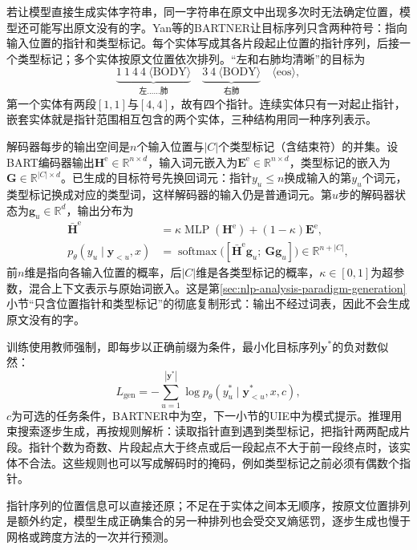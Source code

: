 若让模型直接生成实体字符串，同一字符串在原文中出现多次时无法确定位置，模型还可能写出原文没有的字。Yan等的BARTNER让目标序列只含两种符号：指向输入位置的指针和类型标记。每个实体写成其各片段起止位置的指针序列，后接一个类型标记；多个实体按原文位置依次排列。“左和右肺均清晰”的目标为
\[
  \underbrace{1\ 1\ 4\ 4\ \langle\mathrm{BODY}\rangle}_{\text{左……肺}}\quad
  \underbrace{3\ 4\ \langle\mathrm{BODY}\rangle}_{\text{右肺}}\quad\langle\mathrm{eos}\rangle,
\]
第一个实体有两段$[1,1]$与$[4,4]$，故有四个指针。连续实体只有一对起止指针，嵌套实体就是指针范围相互包含的两个实体，三种结构用同一种序列表示。

解码器每步的输出空间是$n$个输入位置与$|C|$个类型标记（含结束符）的并集。设BART编码器输出$\bm H^{\mathrm e}\in\mathbb R^{n\times d}$，输入词元嵌入为$\bm E^{\mathrm e}\in\mathbb R^{n\times d}$，类型标记的嵌入为$\bm G\in\mathbb R^{|C|\times d}$。已生成的目标符号先换回词元：指针$y_u\leq n$换成输入的第$y_u$个词元，类型标记换成对应的类型词，这样解码器的输入仍是普通词元。第$u$步的解码器状态为$\bm g_u\in\mathbb R^{d}$，输出分布为
\begin{equation}
  \begin{aligned}
    \bar{\bm H}^{\mathrm e}&=\kappa\operatorname{MLP}(\bm H^{\mathrm e})+(1-\kappa)\bm E^{\mathrm e},\\
    p_\theta(y_u\mid\bm y_{<u},x)&=\operatorname{softmax}\bigl([\bar{\bm H}^{\mathrm e}\bm g_u;\ \bm G\bm g_u]\bigr)\in\mathbb R^{n+|C|},
  \end{aligned}
  \label{eq:nlp-extraction-bartner}
\end{equation}
前$n$维是指向各输入位置的概率，后$|C|$维是各类型标记的概率，$\kappa\in[0,1]$为超参数，混合上下文表示与原始词嵌入。这是第\ref{sec:nlp-analysis-paradigm-generation}小节“只含位置指针和类型标记”的彻底复制形式：输出不经过词表，因此不会生成原文没有的字。

训练使用教师强制，即每步以正确前缀为条件，最小化目标序列$\bm y^*$的负对数似然：
\begin{equation}
  L_{\mathrm{gen}}=
  -\sum_{u=1}^{|\bm y^{*}|}
  \log p_\theta(y_u^{*}\mid \bm y_{<u}^{*},x,c),
  \label{eq:nlp-extraction-generation}
\end{equation}
$c$为可选的任务条件，BARTNER中为空，下一小节的UIE中为模式提示。推理用束搜索逐步生成，再按规则解析：读取指针直到遇到类型标记，把指针两两配成片段。指针个数为奇数、片段起点大于终点或后一段起点不大于前一段终点时，该实体不合法。这些规则也可以写成解码时的掩码，例如类型标记之前必须有偶数个指针。

指针序列的位置信息可以直接还原；不足在于实体之间本无顺序，按原文位置排列是额外约定，模型生成正确集合的另一种排列也会受交叉熵惩罚，逐步生成也慢于网格或跨度方法的一次并行预测。

